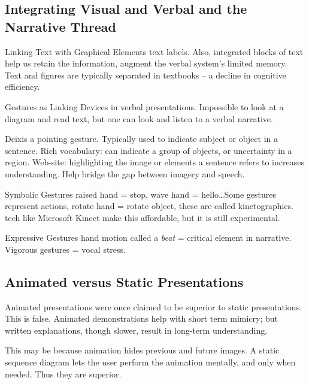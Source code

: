 \begin{mdframed}\begin{multicols}{2}
\subsection{Integrating Visual and Verbal and the Narrative Thread}
\begin{compactdesc}
\item[Linking Text with Graphical Elements] text labels. Also, integrated
    blocks of text help us retain the information, augment the verbal
    system's limited memory. Text and figures are typically separated in
    textbooks -- a decline in cognitive efficiency.
\item[Gestures as Linking Devices] in verbal presentations. Impossible to look
    at a diagram and read text, but one can look and listen to a verbal
    narrative.
\item[Deixis] a pointing gesture. Typically used to indicate subject or
    object in a sentence. Rich vocabulary: can indicate a group of objects,
    or uncertainty in a region. Web-site: highlighting the image or elements a
    sentence refers to increases understanding.
    Help bridge the gap between imagery and speech.
\item[Symbolic Gestures] raised hand = stop, wave hand = hello\dots Some
    gestures represent actions, rotate hand = rotate object, these are called
    kinetographics. tech like Microsoft Kinect make this affordable, but it is
    still experimental.
\item[Expressive Gestures] hand motion called a \textsl{beat} = critical
    element in narrative. Vigorous gestures = vocal stress.
\end{compactdesc}

\subsection{Animated versus Static Presentations}
Animated presentations were once claimed to be superior to static presentations.
This is false. Animated demonstrations help with short term mimicry; but
written explanations, though slower, result in long-term understanding.

This may be because animation hides previous and future images. A static
sequence diagram lets the user perform the animation mentally, and only when
needed. Thus they are superior.


\end{multicols}
\end{mdframed}
